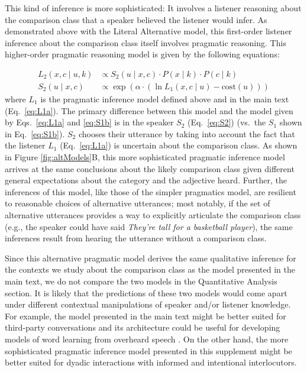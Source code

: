 \documentclass[doc]{apa6}
\begin{document}
This kind of inference is more sophisticated: It involves a listener reasoning about the comparison class that a speaker believed the listener would infer.
As demonstrated above with the Literal Alternative model, this first-order listener inference about the comparison class itself involves pragmatic reasoning. 
This higher-order pragmatic reasoning model is given by the following equations:

\begin{align}
L_2(x, c \mid u, k) &\propto S_2(u \mid x, c) \cdot P(x \mid k) \cdot P(c \mid k) \label{eq:L2} \\
S_2(u \mid x, c) &\propto \exp{(\alpha \cdot (\ln L_{1}(x, c \mid u) - \text{cost}(u) ))}\label{eq:S2} 
\end{align}
%
where $L_1$ is the pragmatic inference model defined above and in the main text (Eq.~\ref{eq:L1a}).
The primary difference between this model and the model given by Eqs.~\ref{eq:L1a} and \ref{eq:S1b} is in the speaker $S_2$ (Eq.~\ref{eq:S2}) (vs.~the $S_1$ shown in Eq.~\ref{eq:S1b}).
$S_2$ chooses their utterance by taking into account the fact that the listener $L_1$ (Eq.~\ref{eq:L1a}) is uncertain about the comparison class. 
As shown in Figure \ref{fig:altModels}B, this more sophisticated pragmatic inference model arrives at the same conclusions about the likely comparison class given different general expectations about the category and the adjective heard.
Further, the inferences of this model, like those of the simpler pragmatics model, are resilient to reasonable choices of alternative utterances; most notably, if the set of alternative utterances provides a way to explicitly articulate the comparison class (e.g., the speaker could have said \emph{They're tall for a basketball player}), the same inferences result from hearing the utterance without a comparison class.

Since this alternative pragmatic model derives the same qualitative inference for the contexts we study about the comparison class as the model presented in the main text, we do not compare the two models in the Quantitative Analysis section. It is likely that the predictions of these two models would come apart under different contextual manipulations of speaker and/or listener knowledge. For example, the model presented in the main text might be better suited for third-party conversations and its architecture could be useful for developing models of word learning from overheard speech \cite{akhtar2001learning, martinez2011orienting}. On the other hand, the more sophisticated pragmatic inference model presented in this supplement might be better suited for dyadic interactions with informed and intentional interlocutors. 
%
%
%
\end{document}
